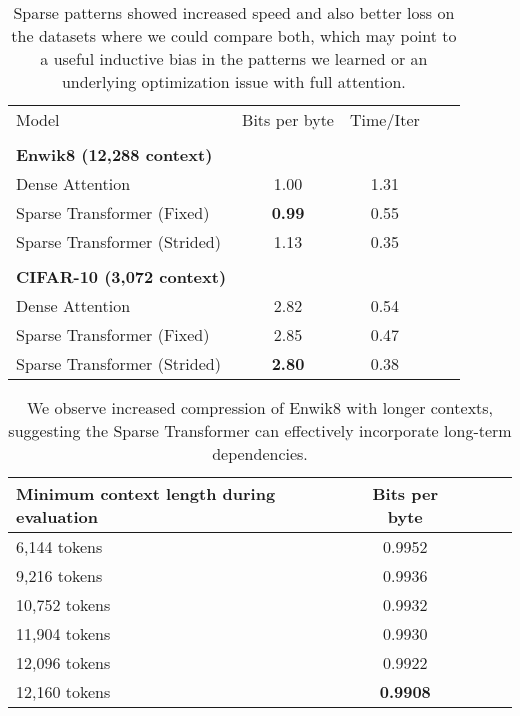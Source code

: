 \documentclass{article}
\begin{document}
\begin{table}[h]
\caption{Sparse patterns showed increased speed and also better loss on the datasets where we could compare both, which may point to a useful inductive bias in the patterns we learned or an underlying optimization issue with full attention.}
\label{compare_attn}
\vskip 0.15in
\begin{center}
\begin{small}
\begin{tabular}{lcccr}
\toprule
Model & Bits per byte & Time/Iter\\
\quad \\
\textbf{Enwik8 (12,288 context)} \\
\midrule
Dense Attention & 1.00 & 1.31\\
Sparse Transformer (Fixed) & \textbf{0.99} & 0.55 \\
Sparse Transformer (Strided) & 1.13 & 0.35 \\
\quad \\
\textbf{CIFAR-10 (3,072 context)} \\
\midrule
Dense Attention & 2.82 & 0.54 \\
Sparse Transformer (Fixed) & 2.85 & 0.47 \\
Sparse Transformer (Strided) & \textbf{2.80} & 0.38 \\

\bottomrule
\end{tabular}
\end{small}
\end{center}
\vskip -0.2in
\end{table}


\begin{table}[h]
\caption{We observe increased compression of Enwik8 with longer contexts, suggesting the Sparse Transformer can effectively incorporate long-term dependencies.}
\label{compare_ctx}
\begin{center}
\begin{small}
\begin{tabular}{lcccr}
\toprule
Minimum context length during evaluation & Bits per byte\\
\midrule
6,144 tokens & 0.9952\\
9,216 tokens & 0.9936 \\
10,752 tokens & 0.9932 \\
11,904 tokens & 0.9930 \\
12,096 tokens & 0.9922 \\
12,160 tokens & \textbf{0.9908} \\

\bottomrule
\end{tabular}
\end{small}
\end{center}
\vskip -0.12in
\end{table}
\end{document}

